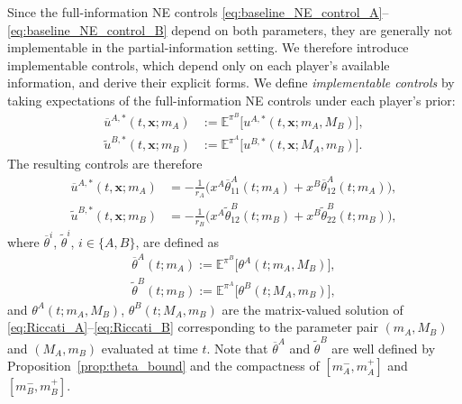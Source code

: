 \documentclass[letterpaper, 10 pt, conference]{ieeeconf}
\newcommand{\E}{\mathbb E}
\begin{document}
Since the full-information NE controls \eqref{eq:baseline_NE_control_A}--\eqref{eq:baseline_NE_control_B} depend on both parameters, they are generally not implementable in the partial-information setting.  We therefore introduce implementable controls, which depend only on each player's available information, and derive their explicit forms. We define \emph{implementable controls} by taking expectations of the full-information NE controls under each player's prior:
\begin{align*}
    \overline{u}^{A,*}(t,\bm{x}; m_A) &:= \E^{\pi^B}\!\big[u^{A,*}(t,\bm{x}; m_A, M_B)\big],\\
    \widetilde{u}^{B,*}(t,\bm{x}; m_B) &:= \E^{\pi^A}\!\big[u^{B,*}(t,\bm{x}; M_A, m_B)\big].
\end{align*}
The resulting controls are therefore
\begin{align*}
\overline{u}^{A,\ast}(t, \bm{x}; m_A) &= -\tfrac{1}{r_A}\big(x^A \overline{\theta}_{11}^A(t;m_A) + x^B \overline{\theta}_{12}^A(t;m_A)\big), \\
    \widetilde{u}^{B,\ast}(t, \bm{x}; m_B) &= -\tfrac{1}{r_B}\big(x^A \widetilde{\theta}_{12}^B(t;m_B) + x^B \widetilde{\theta}_{22}^B(t;m_B)\big),
\end{align*}
where $\overline{\theta}^i$, $\widetilde{\theta}^i$, $i\in \{A,B\}$, are defined as
\begin{equation}\label{eq:implementa_thetai}
\begin{aligned}
\overline{\theta}^{A}(t; m_A) := \E^{\pi^B}\big[\theta^{A}(t; m_A, M_B)\big], \\
\widetilde{\theta}^{B}(t; m_B) := \E^{\pi^A}\big[\theta^{B}(t; M_A, m_B)\big],
\end{aligned}
\end{equation}
and \(\theta^A(t; m_A,M_B)\), \(\theta^B(t; M_A,m_B)\) are the matrix-valued solution of \eqref{eq:Riccati_A}--\eqref{eq:Riccati_B} corresponding to the parameter pair \((m_A,M_B)\) and \((M_A,m_B)\) evaluated at time \(t\).  Note that $\overline{\theta}^A$ and $\widetilde{\theta}^B$ are well defined by Proposition~\ref{prop:theta_bound} and the compactness of $[m_A^-, m_A^+]$ and $[m_B^-, m_B^+]$.
\end{document}
